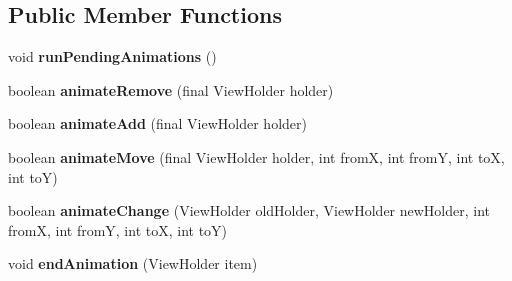 \subsection*{Public Member Functions}
\begin{DoxyCompactItemize}
\item 
\hypertarget{classantardhvani_1_1du_1_1ac_1_1in_1_1antardhvani_1_1_default_item_animator_abd7b29f14683c5b092ea975be446fdf1}{}void {\bfseries run\+Pending\+Animations} ()\label{classantardhvani_1_1du_1_1ac_1_1in_1_1antardhvani_1_1_default_item_animator_abd7b29f14683c5b092ea975be446fdf1}

\item 
\hypertarget{classantardhvani_1_1du_1_1ac_1_1in_1_1antardhvani_1_1_default_item_animator_ae46856f1a51013f74cb8625996c0fbef}{}boolean {\bfseries animate\+Remove} (final View\+Holder holder)\label{classantardhvani_1_1du_1_1ac_1_1in_1_1antardhvani_1_1_default_item_animator_ae46856f1a51013f74cb8625996c0fbef}

\item 
\hypertarget{classantardhvani_1_1du_1_1ac_1_1in_1_1antardhvani_1_1_default_item_animator_ab6b067165dad4c9492f5110bb40a0ff8}{}boolean {\bfseries animate\+Add} (final View\+Holder holder)\label{classantardhvani_1_1du_1_1ac_1_1in_1_1antardhvani_1_1_default_item_animator_ab6b067165dad4c9492f5110bb40a0ff8}

\item 
\hypertarget{classantardhvani_1_1du_1_1ac_1_1in_1_1antardhvani_1_1_default_item_animator_a470df1d9e7cc7302f9f2755033b9020e}{}boolean {\bfseries animate\+Move} (final View\+Holder holder, int from\+X, int from\+Y, int to\+X, int to\+Y)\label{classantardhvani_1_1du_1_1ac_1_1in_1_1antardhvani_1_1_default_item_animator_a470df1d9e7cc7302f9f2755033b9020e}

\item 
\hypertarget{classantardhvani_1_1du_1_1ac_1_1in_1_1antardhvani_1_1_default_item_animator_a5d8f1d746288615e765f5739e553d3c1}{}boolean {\bfseries animate\+Change} (View\+Holder old\+Holder, View\+Holder new\+Holder, int from\+X, int from\+Y, int to\+X, int to\+Y)\label{classantardhvani_1_1du_1_1ac_1_1in_1_1antardhvani_1_1_default_item_animator_a5d8f1d746288615e765f5739e553d3c1}

\item 
\hypertarget{classantardhvani_1_1du_1_1ac_1_1in_1_1antardhvani_1_1_default_item_animator_a2cfcbdeeedf49291f4dcc3bddcd5511c}{}void {\bfseries end\+Animation} (View\+Holder item)\label{classantardhvani_1_1du_1_1ac_1_1in_1_1antardhvani_1_1_default_item_animator_a2cfcbdeeedf49291f4dcc3bddcd5511c}


\end{DoxyCompactItemize}
